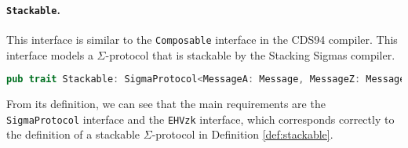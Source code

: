 \paragraph{\texttt{Stackable}.} This interface is similar to the \texttt{Composable}
interface in the CDS94 compiler. This interface models a $\Sigma$-protocol that is stackable 
by the Stacking Sigmas compiler.

\begin{lstlisting}[language=rust]
  pub trait Stackable: SigmaProtocol<MessageA: Message, MessageZ: Message> + EHVzk {}
\end{lstlisting}

From its definition, we can see that the main requirements are the \texttt{SigmaProtocol} 
interface and the \texttt{EHVzk} interface, which corresponds correctly to the definition 
of a stackable $\Sigma$-protocol in Definition \ref{def:stackable}. 

